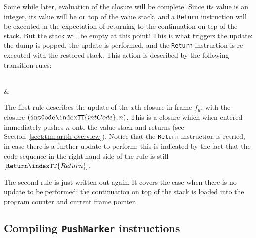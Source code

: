 \par
Some while later, evaluation of the closure will be complete.  Since its
value is an integer, its value will be on top of the value stack, and
a \mbox{\tt Return} instruction will be executed in the expectation of returning
to the continuation on top of the stack.  But the stack will be empty
at this point!  This is what triggers the update: the dump is popped,
the update is performed, and the \mbox{\tt Return} instruction is re-executed
with the restored stack.
This action is described by the following transition rules:
\begin{etimruleVD}
      { \\
        & 
}
\\ \hline
{}
      {}
\end{etimruleVD}

The first rule describes the update of the $x$th closure in frame $f_u$,
with the closure $(\mbox{\tt intCode}\indexTT{intCode}, n)$.  This is a closure which when entered
immediately pushes $n$ onto the value stack and returns
(see Section~\ref{sect:tim:arith-overview}).
Notice that the \mbox{\tt Return} instruction is retried, in case there is a further
update to perform; this is indicated by the fact that the code
sequence in the right-hand side of the rule is still $[\mbox{\tt Return}\indexTT{Return}]$.

The second rule is just  written out again.
It covers the case when there is no update to be performed; the
continuation on top of the stack is loaded into the program counter and
current frame pointer.

\subsection{Compiling \mbox{\tt PushMarker} instructions}

